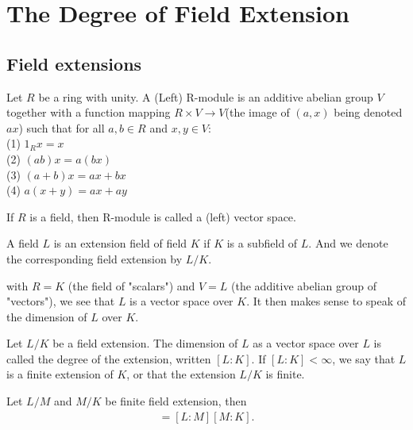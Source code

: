 \chapter{The Degree of Field Extension}\label{chp:6_2}

\section{Field extensions}


\begin{definition}{}{}
    Let $R$ be a ring with unity. A (Left) R-module is an additive abelian group $V$ together with a function mapping
    $R\times V\rightarrow V$(the image of $(a,x)$ being denoted $ax$) such that for all $a,b\in R$ and $x,y\in V$:\\
    (1) $1_Rx=x$\\
    (2) $(ab)x=a(bx)$\\
    (3) $(a+b)x=ax+bx$\\
    (4) $a(x+y)=ax+ay$ 
\end{definition}

\begin{remark}
    If $R$ is a field, then R-module is called a (left) vector space.
\end{remark}

\begin{definition}{}{}
    A field $L$ is an extension field of field $K$ if $K$ is a subfield of $L$. 
    And we denote the corresponding field extension by $L/K$.
\end{definition}

\begin{remark}
    with $R=K$ (the field of "scalars") and $V=L$ (the additive abelian group of "vectors"), we see that $L$ is a vector space over $K$.
    It then makes sense to speak of the dimension of $L$ over $K$.
\end{remark}


\begin{definition}{}{}
    Let $L/K$ be a field extension. The dimension of $L$ as a vector space over $L$
    is called the degree of the extension, written $[L:K]$.
    If $[L:K]<\infty$, we say that $L$ is a finite extension of $K$, or that the extension $L/K$ is finite.
\end{definition}

\begin{proposition}{}{}
    Let $L/M$ and $M/K$ be finite field extension, then
    \begin{align*}
        [L:K]=[L:M][M:K].
    \end{align*}
\end{proposition}

